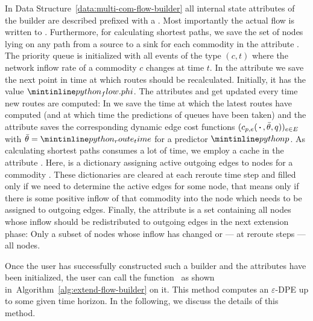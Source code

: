 In Data Structure~\ref{data:multi-com-flow-builder} all internal state attributes of the builder are described prefixed with a \code{_}.
Most importantly the actual flow is written to .
Furthermore, for calculating shortest paths, we save the set of nodes lying on any path from a source to a sink for each commodity in the attribute . 
The priority queue  is initialized with all events of the type $(c, t)$ where the network inflow rate of a commodity $c$ changes at time $t$.
In the attribute  we save the next point in time at which routes should be recalculated.
Initially, it has the value $\code{_flow.phi}$.
The attributes  and  get updated every time new routes are computed:
In  we save the time at which the latest routes have computed (and at which time the predictions of queues have been taken) and the attribute  saves the corresponding dynamic edge cost functions $(c_{p,e}(\,\boldsymbol{\cdot}\,, \bar\theta, q))_{e\in E}$ with $\bar\theta = \code{_route_time}$ for a predictor $\code{p}$.
As calculating shortest paths consumes a lot of time, we employ a cache in the attribute .
Here,  is a dictionary assigning active outgoing edges to nodes for a commodity .
These dictionaries are cleared at each reroute time step and filled only if we need to determine the active edges for some node, that means only if there is some positive inflow of that commodity into the node which needs to be assigned to outgoing edges.
Finally, the attribute  is a set containing all nodes whose inflow should be redistributed to outgoing edges in the next extension phase: Only a subset of nodes whose inflow has changed or — at reroute steps — all nodes.

Once the user has successfully constructed such a builder and the attributes have been initialized, the user can call the function~ as shown in~Algorithm~\ref{alg:extend-flow-builder} on it.
This method computes an $\varepsilon$-DPE up to some given time horizon.
In the following, we discuss the details of this method.
 
